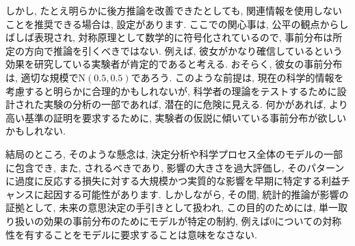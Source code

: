 \documentclass[10pt,dvipdfmx,a4]{beamer}
\begin{document}

\begin{frame}
しかし, たとえ明らかに後方推論を改善できたとしても, 関連情報を使用しないことを推奨できる場合は, 設定があります.
ここでの関心事は, 公平の観点からしばしば表現され, 対称原理として数学的に符号化されているので, 事前分布は所定の方向で推論を引くべきではない.
例えば, 彼女がかなり確信しているという効果を研究している実験者が肯定的であると考える.
おそらく, 彼女の事前分布は, 適切な規模で$\text{N}(0.5, 0.5)$であろう.
このような前提は, 現在の科学的情報を考慮すると明らかに合理的かもしれないが, 科学者の理論をテストするために設計された実験の分析の一部であれば, 潜在的に危険に見える.
何かがあれば, より高い基準の証明を要求するために, 実験者の仮説に傾いている事前分布が欲しいかもしれない.

結局のところ, そのような懸念は, 決定分析や科学プロセス全体のモデルの一部に包含でき, また, されるべきであり, 影響の大きさを過大評価し, そのパターンに過度に反応する損失に対する大規模かつ実質的な影響を早期に特定する利益チャンスに起因する可能性があります.
しかしながら, その間, 統計的推論が影響の証拠として, 未来の意思決定の手引きとして扱われ, この目的のためには, 単一取り扱いの効果の事前分布のためにモデルが特定の制約, 例えば0についての対称性を有することをモデルに要求することは意味をなさない.
\end{frame}

\end{document}
